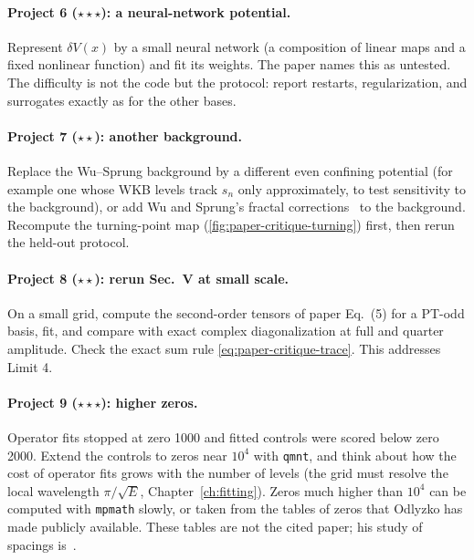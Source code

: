 \paragraph{Project 6 ($\star\star\star$): a neural-network potential.} Represent $\delta V(x)$ by a small neural network (a composition of linear maps and a fixed nonlinear function) and fit its weights. The paper names this as untested. The difficulty is not the code but the protocol: report restarts, regularization, and surrogates exactly as for the other bases.

\paragraph{Project 7 ($\star\star$): another background.} Replace the Wu--Sprung background by a different even confining potential (for example one whose WKB levels track $s_n$ only approximately, to test sensitivity to the background), or add Wu and Sprung's fractal corrections~\cite{wusprung} to the background. Recompute the turning-point map (\cref{fig:paper-critique-turning}) first, then rerun the held-out protocol.

\paragraph{Project 8 ($\star\star$): rerun Sec.~V at small scale.} On a small grid, compute the second-order tensors of paper Eq.~(5) for a PT-odd basis, fit, and compare with exact complex diagonalization at full and quarter amplitude. Check the exact sum rule \eqref{eq:paper-critique-trace}. This addresses Limit 4.

\paragraph{Project 9 ($\star\star\star$): higher zeros.} Operator fits stopped at zero 1000 and fitted controls were scored below zero 2000. Extend the controls to zeros near $10^4$ with \texttt{qmnt}, and think about how the cost of operator fits grows with the number of levels (the grid must resolve the local wavelength $\pi/\sqrt E$, Chapter~\ref{ch:fitting}). Zeros much higher than $10^4$ can be computed with \texttt{mpmath} slowly, or taken from the tables of zeros that Odlyzko has made publicly available. These tables are not the cited paper; his study of spacings is~\cite{odlyzko87}.


